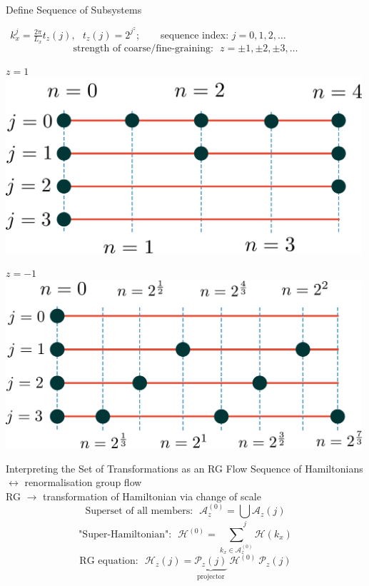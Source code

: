 \documentclass[12pt,aspectratio=169]{beamer}
\begin{document}
\begin{frame}{Define Sequence of Subsystems}

\(~ ~ k_x^j = \frac{2\pi}{L_x}t_z(j), ~ ~ ~ t_z(j) = 2^{j^z}\);~ ~ ~sequence index: \(j = 0,1,2,\ldots\)
\[\text{strength of coarse/fine-graining:}~ ~ ~ z = \pm 1,\pm 2,\pm 3,\ldots\]
\begin{minipage}{0.48\textwidth}
\centering
\( z = 1\)\\
\includegraphics[width=0.99\textwidth]{./figures/coarse-graining.pdf}
\end{minipage}
\hspace*{\fill}
\begin{minipage}{0.49\textwidth}
\centering
\( z = -1\)\\
\includegraphics[width=0.99\textwidth]{./figures/fine-graining.pdf}
\end{minipage}
\end{frame}

\begin{frame}{Interpreting the Set of Transformations as an RG Flow}
	Sequence of Hamiltonians \(\leftrightarrow\) \alert{renormalisation} group flow\\[10pt]
	RG \(\rightarrow\) transformation of Hamiltonian via change of scale\\
	\[\text{Superset of all members:}~ ~ ~ \mathcal{A}_z^{(0)} = \bigcup_j \mathcal{A}_z(j)\]
	\[\text{"Super-Hamiltonian":}~ ~ ~\mathcal{H}^{(0)} = \sum_{k_x \in \mathcal{A}_z^{(0)}} \mathcal{H}\left( k_x \right)\]
	\[\text{RG equation:}~ ~ ~\mathcal{H}_z(j) = \underbrace{\mathcal{P}_z(j)}_\text{projector} ~ \mathcal{H}^{(0)} ~ \mathcal{P}_z(j)\]
\end{frame}
\end{document}

